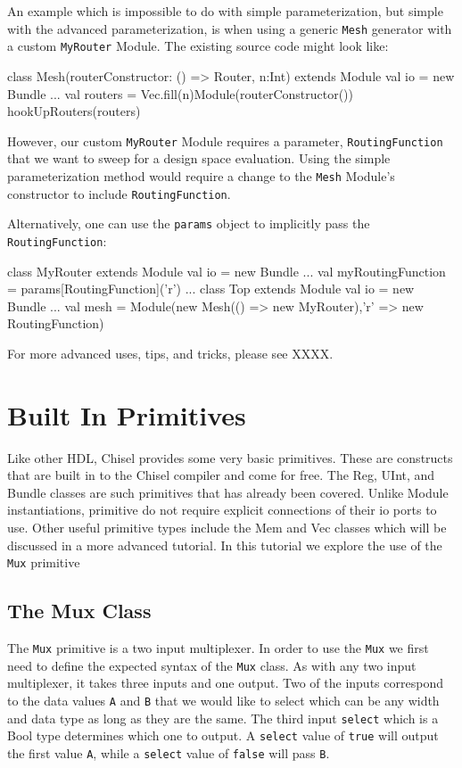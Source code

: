 An example which is impossible to do with simple parameterization, but simple with the advanced parameterization, is when using a generic \verb+Mesh+ generator with a custom \verb+MyRouter+ Module. The existing source code might look like:

\begin{scala}
class Mesh(routerConstructor: () => Router, n:Int) extends Module {
  val io = new Bundle { ... }
  val routers = Vec.fill(n){Module(routerConstructor())}
  hookUpRouters(routers)
}
\end{scala}

However, our custom \verb+MyRouter+ Module requires a parameter, \verb+RoutingFunction+ that we want to sweep for a design space evaluation. Using the simple parameterization method would require a change to the \verb+Mesh+ Module's constructor to include \verb+RoutingFunction+. 

Alternatively, one can use the \verb+params+ object to implicitly pass the \verb+RoutingFunction+:

\begin{scala}
class MyRouter extends Module {
  val io = new Bundle { ... }
  val myRoutingFunction = params[RoutingFunction]('r')
  ...
}
class Top extends Module {
  val io = new Bundle { ... }
  val mesh = Module(new Mesh(() => new MyRouter),{'r' => new RoutingFunction})
}
\end{scala}

For more advanced uses, tips, and tricks, please see XXXX.

\section{Built In Primitives}

Like other HDL, Chisel provides some very basic primitives. These are constructs that are built in to the Chisel compiler and come for free. The Reg, UInt, and Bundle classes are such primitives that has already been covered. Unlike Module instantiations, primitive do not require explicit connections of their io ports to use. Other useful primitive types include the Mem and Vec classes which will be discussed in a more advanced tutorial. In this tutorial we explore the use of the \verb+Mux+ primitive

\subsection{The Mux Class}

The \verb+Mux+ primitive is a two input multiplexer. In order to use the \verb+Mux+ we first need to define the expected syntax of the \verb+Mux+ class. As with any two input multiplexer, it takes three inputs and one output. Two of the inputs correspond to the data values \verb+A+ and \verb+B+ that we would like to select which can be any width and data type as long as they are the same. The third input \verb+select+ which is a Bool type determines which one to output.
A \verb+select+ value of \verb+true+ will output the first value \verb+A+, while a \verb+select+ value of \verb+false+ will pass \verb+B+.

